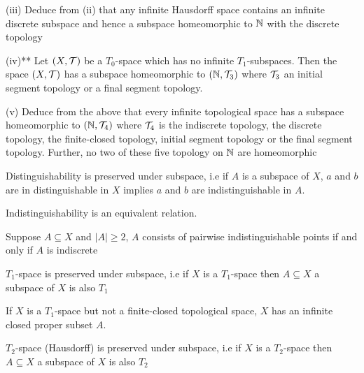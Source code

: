 \documentclass{article}
\begin{document}
    (iii) Deduce from (ii) that any infinite Hausdorff space contains an infinite discrete subspace and hence a subspace homeomorphic to $\mathbb{N}$ with the discrete topology

    (iv)** Let $(X, \mathcal{T})$ be a $T_0$-space which has no infinite $T_1$-subspaces. Then the space $(X, \mathcal{T})$ has a subspace homeomorphic to $(\mathbb{N}, \mathcal{T}_3)$ where $\mathcal{T}_3$ an initial segment topology or a final segment topology.

    (v) Deduce from the above that every infinite topological space has a subspace homeomorphic to $(\mathbb{N}, \mathcal{T}_4)$ where $\mathcal{T}_4$ is the indiscrete topology, the discrete topology, the finite-closed topology, initial segment topology or the final segment topology. Further, no two of these five topology on $\mathbb{N}$ are homeomorphic

\begin{lemma}
    \label{lemma_4.3.8.1}
    Distinguishability is preserved under subspace, i.e if $A$ is a subspace of $X$, $a$ and $b$ are in distinguishable in $X$ implies $a$ and $b$ are indistinguishable in $A$.
\end{lemma}

\begin{lemma}
    \label{lemma_4.3.8.2}
    Indistinguishability is an equivalent relation.
\end{lemma}

\begin{lemma}
    \label{lemma_4.3.8.3}
    Suppose $A \subseteq X$ and $|A| \geq 2$, $A$ consists of pairwise indistinguishable points if and only if $A$ is indiscrete
\end{lemma}

\begin{lemma}
    \label{lemma_4.3.8.4}
    $T_1$-space is preserved under subspace, i.e if $X$ is a $T_1$-space then $A \subseteq X$ a subspace of $X$ is also $T_1$
\end{lemma}

\begin{lemma}
    \label{lemma_4.3.8.5}
    If $X$ is a $T_1$-space but not a finite-closed topological space, $X$ has an infinite closed proper subset $A$.
\end{lemma}

\begin{lemma}
    \label{lemma_4.3.8.6}
    $T_2$-space (Hausdorff) is preserved under subspace, i.e if $X$ is a $T_2$-space then $A \subseteq X$ a subspace of $X$ is also $T_2$
\end{lemma}
\end{document}
